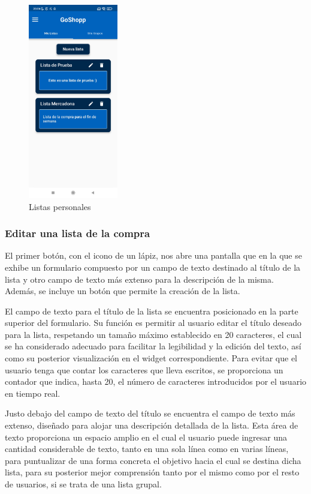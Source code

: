 \documentclass{article}
\begin{document}
\begin{figure}[h]
   \centering
    \includegraphics[width=0.35\textwidth]{imagenes/pantallas/listas/listas.jpg}
    \caption{Listas personales}
\end{figure}

\subsubsection{Editar una lista de la compra}

El primer botón, con el icono de un lápiz, nos abre una pantalla que en la que se exhibe un formulario compuesto por un campo de texto destinado al título de la lista y otro campo de texto más extenso para la descripción de la misma. Además, se incluye un botón que permite la creación de la lista.

El campo de texto para el título de la lista se encuentra posicionado en la parte superior del formulario. Su función es permitir al usuario editar el título deseado para la lista, respetando un tamaño máximo establecido en 20 caracteres, el cual se ha considerado adecuado para facilitar la legibilidad y la edición del texto, así como su posterior visualización en el widget correspondiente. Para evitar que el usuario tenga que contar los caracteres que lleva escritos, se proporciona un contador que indica, hasta 20, el número de caracteres introducidos por el usuario en tiempo real.

Justo debajo del campo de texto del título se encuentra el campo de texto más extenso, diseñado para alojar una descripción detallada de la lista. Esta área de texto proporciona un espacio amplio en el cual el usuario puede ingresar una cantidad considerable de texto, tanto en una sola línea como en varias líneas, para puntualizar de una forma concreta el objetivo hacia el cual se destina dicha lista, para su posterior mejor comprensión tanto por el mismo como por el resto de usuarios, si se trata de una lista grupal.
\end{document}

